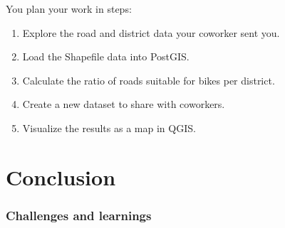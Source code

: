 \documentclass[11pt, a4paper, oneside, parskip=full-]{scrartcl}
\begin{document}
You plan your work in steps:
\begin{enumerate}
  \item Explore the road and district data your coworker sent you.
  \item Load the Shapefile data into PostGIS.
  \item Calculate the ratio of roads suitable for bikes per district.
  \item Create a new dataset to share with coworkers.
  \item Visualize the results as a map in QGIS.
\end{enumerate}

\section{Conclusion}

\subsubsection*{Challenges and learnings}

\printbibliography
\end{document}
